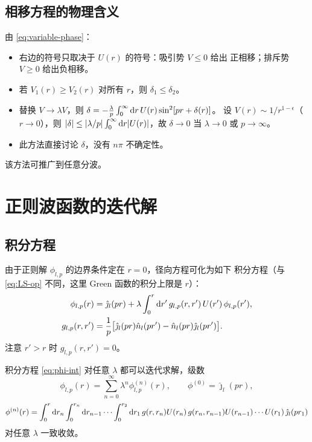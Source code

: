 \subsection{相移方程的物理含义}

由 \eqref{eq:variable-phase}：
\begin{itemize}
\item 右边的符号只取决于 $U(r)$ 的符号：吸引势 $V\le0$ 给出
  正相移；排斥势 $V\ge0$ 给出负相移。
\item 若 $V_1(r)\ge V_2(r)$ 对所有 $r$，则 $\delta_1\le\delta_2$。
\item 替换 $V\to\lambda V$，则
  $\delta=-\frac{\lambda}{p}\int_0^\infty\mathrm{d} r\,U(r)\sin^2[pr+\delta(r)]$。
  设 $V(r)\sim 1/r^{1-\epsilon}$（$r\to0$），则
  $|\delta|\le|\lambda/p|\int_0^\infty\mathrm{d} r|U(r)|$，故
  $\delta\to0$ 当 $\lambda\to0$ 或 $p\to\infty$。
\item 此方法直接讨论 $\delta$，没有 $n\pi$ 不确定性。
\end{itemize}
该方法可推广到任意分波。

\section{正则波函数的迭代解}\label{sec:phi-iter}

\subsection{积分方程}

由于正则解 $\phi_{l,p}$ 的边界条件定在 $r=0$，径向方程可化为如下
积分方程（与 \eqref{eq:LS-op} 不同，这里 Green 函数的积分上限是
$r$）：
\begin{align}\label{eq:phi-int}
\phi_{l,p}(r)&=\hat\jmath_l(pr)+\lambda\int_0^r \mathrm{d} r'\,
   g_{l,p}(r,r')\,U(r')\,\phi_{l,p}(r'),\\
g_{l,p}(r,r')&=\frac{1}{p}\bigl[\hat\jmath_l(pr)\hat n_l(pr')-\hat n_l(pr)\hat\jmath_l(pr')\bigr].
\label{eq:glp}
\end{align}
注意 $r'>r$ 时 $g_{l,p}(r,r')=0$。

\begin{theorem}\label{thm:phi-series}
积分方程 \eqref{eq:phi-int} 对任意 $\lambda$ 都可以迭代求解，级数
\begin{equation}\label{eq:phi-series}
\phi_{l,p}(r)=\sum_{n=0}^\infty \lambda^n\phi_{l,p}^{(n)}(r),\qquad
\phi^{(0)}=\hat\jmath_l(pr),
\end{equation}
\[
\phi^{(n)}(r)
= \int_0^r \mathrm{d} r_n\int_0^{r_n} \mathrm{d} r_{n-1}\cdots\int_0^{r_2} \mathrm{d} r_1\,
  g(r,r_n)U(r_n)\,g(r_n,r_{n-1})U(r_{n-1})\cdots U(r_1)\,\hat\jmath_l(pr_1)
\]
对任意 $\lambda$ 一致收敛。
\end{theorem}


